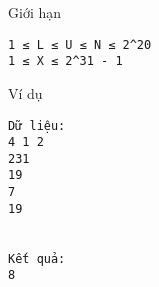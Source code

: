 Giới hạn
\begin{verbatim}
1 ≤ L ≤ U ≤ N ≤ 2^20
1 ≤ X ≤ 2^31 - 1
\end{verbatim}
Ví dụ
\begin{verbatim}
Dữ liệu:
4 1 2
231
19
7
19


Kết quả:
8
\end{verbatim}